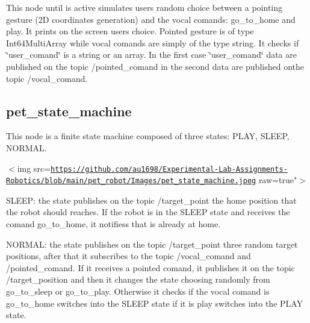 This node until is active simulates user\textquotesingle{}s random choice between a pointing gesture (2D coordinates generation) and the vocal comands\+: \textquotesingle{}go\+\_\+to\+\_\+home\textquotesingle{} and \textquotesingle{}play\textquotesingle{}. It prints on the screen user\textquotesingle{}s choice. Pointed gesture is of type \textquotesingle{}Int64\+Multi\+Array\textquotesingle{} while vocal comands are simply of the type \textquotesingle{}string\textquotesingle{}. It checks if \char`\"{}user\+\_\+comand\char`\"{} is a string or an array. In the first case \char`\"{}user\+\_\+comand\char`\"{} data are published on the topic /pointed\+\_\+comand in the second data are published onthe topic /vocal\+\_\+comand.

\subsection*{pet\+\_\+state\+\_\+machine}

This node is a finite state machine composed of three states\+: P\+L\+AY, S\+L\+E\+EP, N\+O\+R\+M\+AL.

$<$img src=\href{https://github.com/au1698/Experimental-Lab-Assignments-Robotics/blob/main/pet_robot/Images/pet_state_machine.jpeg}{\tt https\+://github.\+com/au1698/\+Experimental-\/\+Lab-\/\+Assignments-\/\+Robotics/blob/main/pet\+\_\+robot/\+Images/pet\+\_\+state\+\_\+machine.\+jpeg} raw=true"$>$ 

S\+L\+E\+EP\+: the state publishes on the topic \textquotesingle{}/target\+\_\+point\textquotesingle{} the home position that the robot should reaches. If the robot is in the \textquotesingle{}S\+L\+E\+EP\textquotesingle{} state and receives the comand \textquotesingle{}go\+\_\+to\+\_\+home\textquotesingle{}, it notifiess that is already at home.

N\+O\+R\+M\+AL\+: the state publishes on the topic \textquotesingle{}/target\+\_\+point\textquotesingle{} three random target positions, after that it subscribes to the topic \textquotesingle{}/vocal\+\_\+comand\textquotesingle{} and \textquotesingle{}/pointed\+\_\+comand\textquotesingle{}. If it receives a pointed comand, it publishes it on the topic \textquotesingle{}/target\+\_\+position\textquotesingle{} and then it changes the state choosing randomly from \textquotesingle{}go\+\_\+to\+\_\+sleep\textquotesingle{} or \textquotesingle{}go\+\_\+to\+\_\+play\textquotesingle{}. Otherwise it checks if the vocal comand is \textquotesingle{}go\+\_\+to\+\_\+home\textquotesingle{} switches into the \textquotesingle{}S\+L\+E\+EP\textquotesingle{} state if it is \textquotesingle{}play\textquotesingle{} switches into the \textquotesingle{}P\+L\+AY\textquotesingle{} state.

